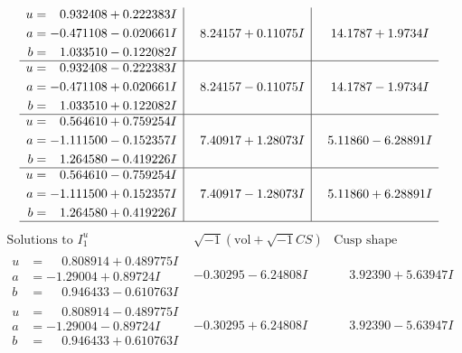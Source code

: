 \documentclass[1p]{elsarticle_modified}
\theoremstyle{definition}
\newcommand{\I}{\sqrt{-1}}
\begin{document}
$$\begin{array}{c|c|c}
\begin{aligned}
u &= \phantom{-}0.932408 + 0.222383 I \\
a &= -0.471108 - 0.020661 I \\
b &= \phantom{-}1.033510 - 0.122082 I\end{aligned}
 & \phantom{-}8.24157 + 0.11075 I & \phantom{-}14.1787 + 1.9734 I \\ \hline\begin{aligned}
u &= \phantom{-}0.932408 - 0.222383 I \\
a &= -0.471108 + 0.020661 I \\
b &= \phantom{-}1.033510 + 0.122082 I\end{aligned}
 & \phantom{-}8.24157 - 0.11075 I & \phantom{-}14.1787 - 1.9734 I \\ \hline\begin{aligned}
u &= \phantom{-}0.564610 + 0.759254 I \\
a &= -1.111500 - 0.152357 I \\
b &= \phantom{-}1.264580 - 0.419226 I\end{aligned}
 & \phantom{-}7.40917 + 1.28073 I & \phantom{-}5.11860 - 6.28891 I \\ \hline\begin{aligned}
u &= \phantom{-}0.564610 - 0.759254 I \\
a &= -1.111500 + 0.152357 I \\
b &= \phantom{-}1.264580 + 0.419226 I\end{aligned}
 & \phantom{-}7.40917 - 1.28073 I & \phantom{-}5.11860 + 6.28891 I\\
 \hline 
 \end{array}$$\newpage$$\begin{array}{c|c|c}  
\text{Solutions to }I^u_{1}& \I (\text{vol} + \sqrt{-1}CS) & \text{Cusp shape}\\
 \hline 
\begin{aligned}
u &= \phantom{-}0.808914 + 0.489775 I \\
a &= -1.29004 + 0.89724 I \\
b &= \phantom{-}0.946433 - 0.610763 I\end{aligned}
 & -0.30295 - 6.24808 I & \phantom{-}3.92390 + 5.63947 I \\ \hline\begin{aligned}
u &= \phantom{-}0.808914 - 0.489775 I \\
a &= -1.29004 - 0.89724 I \\
b &= \phantom{-}0.946433 + 0.610763 I\end{aligned}
 & -0.30295 + 6.24808 I & \phantom{-}3.92390 - 5.63947 I \\ \hline\begin{aligned}

\end{aligned}
\end{array}$$
\end{document}
